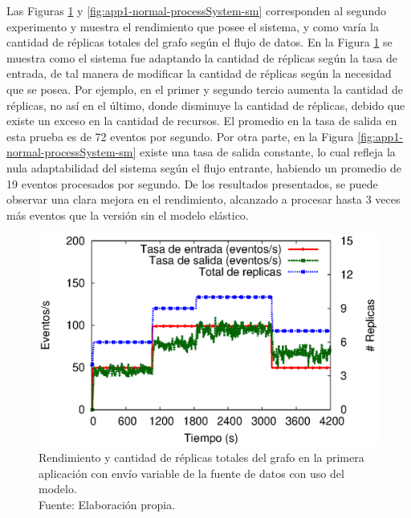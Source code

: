 Las Figuras \ref{fig:app1-normal-processSystem-cm} y \ref{fig:app1-normal-processSystem-sm} \normalsize{corresponden al segundo experimento y muestra el rendimiento que posee el sistema, y como var\'ia la cantidad de r\'eplicas totales del grafo seg\'un el flujo de datos.} En la Figura \ref{fig:app1-normal-processSystem-cm} \normalsize{se muestra como el sistema fue adaptando la cantidad de r\'eplicas seg\'un la tasa de entrada, de tal manera de modificar la cantidad de r\'eplicas seg\'un la necesidad que se posea. Por ejemplo, en el primer y segundo tercio aumenta la cantidad de r\'eplicas, no as\'i en el \'ultimo, donde disminuye la cantidad de r\'eplicas, debido que existe un exceso en la cantidad de recursos. El promedio en la tasa de salida en esta prueba es de 72 eventos por segundo.} Por otra parte, en la Figura \ref{fig:app1-normal-processSystem-sm} \normalsize{existe una tasa de salida constante, lo cual refleja la nula adaptabilidad del sistema seg\'un el flujo entrante, habiendo un promedio de 19 eventos procesados por segundo. De los resultados presentados, se puede observar una clara mejora en el rendimiento, alcanzado a procesar hasta 3 veces m\'as eventos que la versi\'on sin el modelo el\'astico.}

\begin{figure}[!ht]
	\centering
	\captionsetup{justification=centering}
	\includegraphics[scale=0.7]{images/exp/app1/normal/cm/processSystem.eps}
    \caption[Rendimiento y cantidad de r\'eplicas totales del grafo en la primera aplicaci\'on con env\'io variable de la fuente de datos con uso del modelo.]{Rendimiento y cantidad de r\'eplicas totales del grafo en la primera aplicaci\'on con env\'io variable de la fuente de datos con uso del modelo.\\Fuente: Elaboraci\'on propia.}
	\label{fig:app1-normal-processSystem-cm}
\end{figure}

